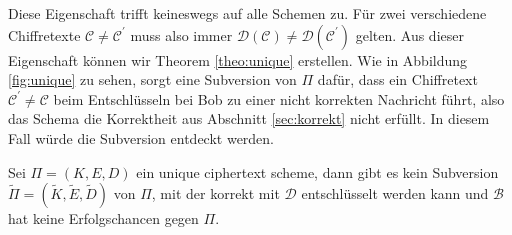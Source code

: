 Diese Eigenschaft trifft keineswegs auf alle Schemen zu. Für zwei verschiedene Chiffretexte $\mathcal{C} \neq \mathcal{C}^{'}$ muss also immer $\mathcal{D}(\mathcal{C}) \neq \mathcal{D}(\mathcal{C}^{'})$ gelten. Aus dieser Eigenschaft können wir Theorem \ref{theo:unique} erstellen. Wie in Abbildung \ref{fig:unique} zu sehen, sorgt eine Subversion von $\Pi$ dafür, dass ein Chiffretext $\mathcal{C}^{'} \neq \mathcal{C}$ beim Entschlüsseln bei Bob zu einer nicht korrekten Nachricht führt, also das Schema die Korrektheit aus Abschnitt \ref{sec:korrekt} nicht erfüllt. In diesem Fall würde die Subversion entdeckt werden.
	
\begin{theorem}
\label{theo:unique}

Sei $\Pi = (K, E, D)$ ein unique ciphertext scheme, dann gibt es kein Subversion $\widetilde{\Pi} = (\widetilde{K}, \widetilde{E}, \widetilde{D})$ von $\Pi$, mit der korrekt mit $\mathcal{D}$ entschlüsselt werden kann und $\mathscr{B}$ hat keine Erfolgschancen gegen $\Pi$.

\end{theorem}
